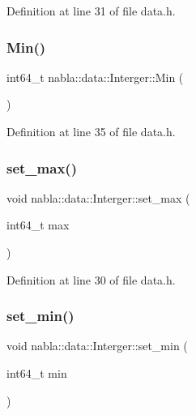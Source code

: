 Definition at line 31 of file data.\+h.

\mbox{\label{classnabla_1_1data_1_1_interger_a45433ae8b5f064f9acd1667a0f9dbdc0}} 
\subsubsection{\texorpdfstring{Min()}{Min()}}
{\footnotesize\ttfamily int64\+\_\+t nabla\+::data\+::\+Interger\+::\+Min (\begin{DoxyParamCaption}{ }\end{DoxyParamCaption})\hspace{0.3cm}{\ttfamily [inline]}}



Definition at line 35 of file data.\+h.

\mbox{\label{classnabla_1_1data_1_1_interger_a2966879b4333e9ff34458a07b658cc94}} 
\subsubsection{\texorpdfstring{set\_max()}{set\_max()}}
{\footnotesize\ttfamily void nabla\+::data\+::\+Interger\+::set\+\_\+max (\begin{DoxyParamCaption}\item[{int64\+\_\+t}]{max }\end{DoxyParamCaption})\hspace{0.3cm}{\ttfamily [inline]}}



Definition at line 30 of file data.\+h.

\mbox{\label{classnabla_1_1data_1_1_interger_a6a8f7127f186c70e6ef58f91814c43e4}} 
\subsubsection{\texorpdfstring{set\_min()}{set\_min()}}
{\footnotesize\ttfamily void nabla\+::data\+::\+Interger\+::set\+\_\+min (\begin{DoxyParamCaption}\item[{int64\+\_\+t}]{min }\end{DoxyParamCaption})\hspace{0.3cm}{\ttfamily [inline]}}



